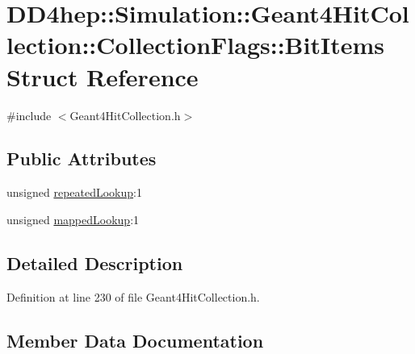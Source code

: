\hypertarget{struct_d_d4hep_1_1_simulation_1_1_geant4_hit_collection_1_1_collection_flags_1_1_bit_items}{}\section{D\+D4hep\+:\+:Simulation\+:\+:Geant4\+Hit\+Collection\+:\+:Collection\+Flags\+:\+:Bit\+Items Struct Reference}
\label{struct_d_d4hep_1_1_simulation_1_1_geant4_hit_collection_1_1_collection_flags_1_1_bit_items}


{\ttfamily \#include $<$Geant4\+Hit\+Collection.\+h$>$}

\subsection*{Public Attributes}
\begin{DoxyCompactItemize}
\item 
unsigned \hyperlink{struct_d_d4hep_1_1_simulation_1_1_geant4_hit_collection_1_1_collection_flags_1_1_bit_items_af334712a202c01ad71ea6578067ef3f7}{repeated\+Lookup}\+:1
\item 
unsigned \hyperlink{struct_d_d4hep_1_1_simulation_1_1_geant4_hit_collection_1_1_collection_flags_1_1_bit_items_acf2a99b0be08d73a82ec6ac4d5841686}{mapped\+Lookup}\+:1
\end{DoxyCompactItemize}


\subsection{Detailed Description}


Definition at line 230 of file Geant4\+Hit\+Collection.\+h.



\subsection{Member Data Documentation}
\hypertarget{struct_d_d4hep_1_1_simulation_1_1_geant4_hit_collection_1_1_collection_flags_1_1_bit_items_acf2a99b0be08d73a82ec6ac4d5841686}{}\label{struct_d_d4hep_1_1_simulation_1_1_geant4_hit_collection_1_1_collection_flags_1_1_bit_items_acf2a99b0be08d73a82ec6ac4d5841686} 
